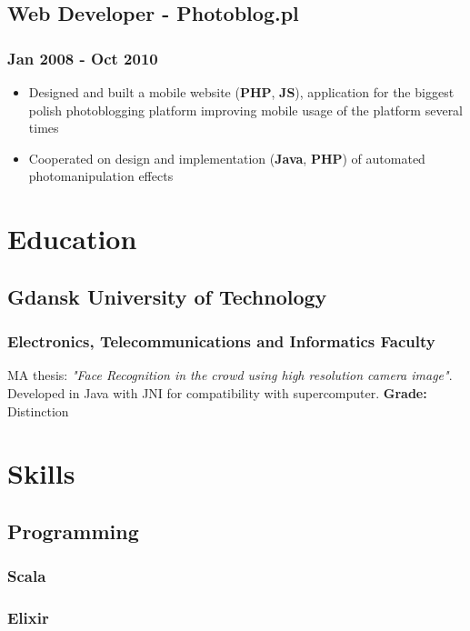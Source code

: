 \documentclass[11pt]{article}
\begin{document}
\subsection*{Web Developer - Photoblog.pl}
\label{sec:org528e3c0}
\subsubsection*{Jan 2008 - Oct 2010}
\label{sec:org2561059}
\begin{itemize}
\item Designed and built a mobile website (\textbf{PHP}, \textbf{JS}), application for the biggest polish photoblogging platform improving mobile usage of the platform several times
\item Cooperated on design and implementation (\textbf{Java}, \textbf{PHP}) of automated photomanipulation effects
\end{itemize}
\section*{Education}
\label{sec:org0f65662}
\subsection*{Gdansk University of Technology}
\label{sec:org4ba79b4}
\subsubsection*{Electronics, Telecommunications and Informatics Faculty}
\label{sec:orgbde48b0}
MA thesis: \emph{"Face Recognition in the crowd using high resolution camera image"}. Developed in Java with JNI for compatibility with supercomputer. 
\textbf{Grade:} Distinction

\section*{Skills}
\label{sec:org390ed82}
\subsection*{Programming}
\label{sec:orgacd362c}
\subsubsection*{Scala}
\label{sec:orge2166d1}
\subsubsection*{Elixir}
\label{sec:org4d89008}
\end{document}
